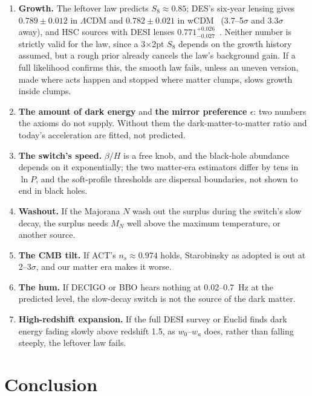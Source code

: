 \documentclass[11pt,a4paper]{article}
\begin{document}
\begin{enumerate}[leftmargin=*,itemsep=2pt]
\item \textbf{Growth.} The leftover law predicts $S_8\approx0.85$; DES's six-year lensing gives $0.789\pm0.012$ in $\Lambda$CDM and
$0.782\pm0.021$ in wCDM~\cite{desy6} (3.7--5$\sigma$ and 3.3$\sigma$ away), and HSC sources with DESI lenses $0.771^{+0.026}_{-0.027}$~\cite{porredon}.
Neither number is strictly valid for the law, since a 3$\times$2pt $S_8$ depends on the growth history assumed, but a rough prior already
cancels the law's background gain. If a full likelihood confirms this, the smooth law fails, unless an uneven version, made where acts
happen and stopped where matter clumps, slows growth inside clumps.
\item \textbf{The amount of dark energy} and \textbf{the mirror preference $\epsilon$}: two numbers the axioms do not supply. Without them the
dark-matter-to-matter ratio and today's acceleration are fitted, not predicted.
\item \textbf{The switch's speed.} $\beta/H$ is a free knob, and the black-hole abundance depends on it exponentially; the two matter-era
estimators differ by tens in $\ln P$, and the soft-profile thresholds are dispersal boundaries, not shown to end in black holes.
\item \textbf{Washout.} If the Majorana $N$ wash out the surplus during the switch's slow decay, the surplus needs $M_N$ well above
the maximum temperature, or another source.
\item \textbf{The CMB tilt.} If ACT's $n_s\approx0.974$ holds, Starobinsky as adopted is out at 2--3$\sigma$, and our matter era makes it worse.
\item \textbf{The hum.} If DECIGO or BBO hears nothing at 0.02--0.7~Hz at the predicted level, the slow-decay switch is not the source of
the dark matter.
\item \textbf{High-redshift expansion.} If the full DESI survey or Euclid finds dark energy fading slowly above redshift 1.5, as $w_0$--$w_a$ does,
rather than falling steeply, the leftover law fails.
\end{enumerate}

\section{Conclusion}
\end{document}
